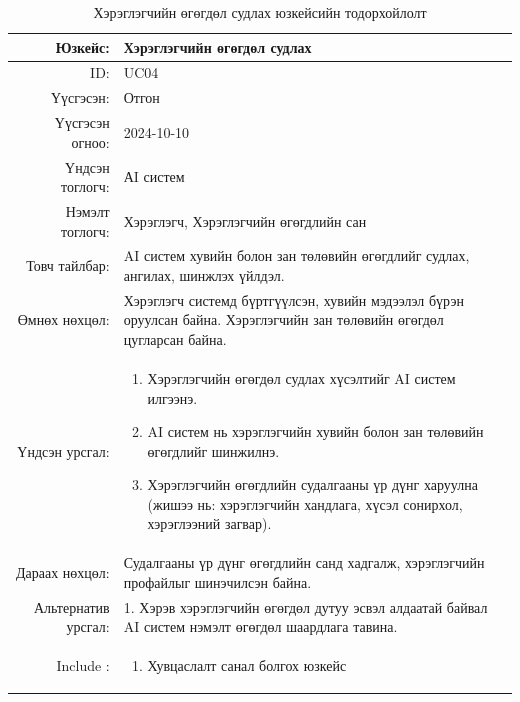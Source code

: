 \newpage
\begin{longtable}{|r|p{11.5cm}|}
    \caption{Хэрэглэгчийн өгөгдөл судлах юзкейсийн тодорхойлолт} 
    \label{table:songolt3}\\ \hline
    {Юзкейс:} & {Хэрэглэгчийн өгөгдөл судлах}\\ \hline
    {ID:} & {UC04}\\ \hline
    {Үүсгэсэн:} & {Отгон }\\ \hline
    {Үүсгэсэн огноо:} & {2024-10-10}\\ \hline
    {Үндсэн тоглогч:} & {АI систем }\\ \hline
    {Нэмэлт тоглогч:} & {Хэрэглэгч, Хэрэглэгчийн өгөгдлийн сан}\\ \hline
    {Товч тайлбар:} & {AI систем хувийн болон зан төлөвийн өгөгдлийг судлах, ангилах, шинжлэх үйлдэл.}\\ \hline
    {Өмнөх нөхцөл:} & {Хэрэглэгч системд бүртгүүлсэн, хувийн мэдээлэл бүрэн оруулсан байна. Хэрэглэгчийн зан төлөвийн өгөгдөл цугларсан байна.}\\ \hline
    {Үндсэн урсгал:} & {\begin{enumerate}
        \item Хэрэглэгчийн өгөгдөл судлах хүсэлтийг AI систем  илгээнэ.
    \item AI систем нь хэрэглэгчийн хувийн болон зан төлөвийн өгөгдлийг шинжилнэ.
    \item Хэрэглэгчийн өгөгдлийн судалгааны үр дүнг харуулна (жишээ нь: хэрэглэгчийн хандлага, хүсэл сонирхол, хэрэглээний загвар).\end{enumerate}}\\ \hline
    {Дараах нөхцөл:} & {Судалгааны үр дүнг өгөгдлийн санд хадгалж, хэрэглэгчийн профайлыг шинэчилсэн байна.}\\ \hline
    {Альтернатив урсгал:} & {1. Хэрэв хэрэглэгчийн өгөгдөл дутуу эсвэл алдаатай байвал AI систем нэмэлт өгөгдөл шаардлага тавина.}\\ \hline
    {Include :} & {\begin{enumerate}
        \item Хувцаслалт санал болгох юзкейс
    \end{enumerate}}\\ \hline
\end{longtable}
\newpage
